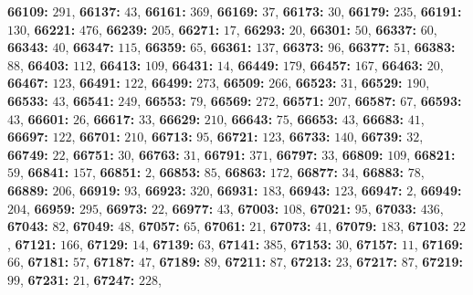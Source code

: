 \textsf{\bfseries 66109:} $291$, \textsf{\bfseries 66137:} $43$, \textsf{\bfseries 66161:} $369$, \textsf{\bfseries 66169:} $37$, \textsf{\bfseries 66173:} $30$, \textsf{\bfseries 66179:} $235$, \textsf{\bfseries 66191:} $130$, \textsf{\bfseries 66221:} $476$, \textsf{\bfseries 66239:} $205$, \textsf{\bfseries 66271:} $17$, \textsf{\bfseries 66293:} $20$, \textsf{\bfseries 66301:} $50$, \textsf{\bfseries 66337:} $60$, \textsf{\bfseries 66343:} $40$, \textsf{\bfseries 66347:} $115$, \textsf{\bfseries 66359:} $65$, \textsf{\bfseries 66361:} $137$, \textsf{\bfseries 66373:} $96$, \textsf{\bfseries 66377:} $51$, \textsf{\bfseries 66383:} $88$, \textsf{\bfseries 66403:} $112$, \textsf{\bfseries 66413:} $109$, \textsf{\bfseries 66431:} $14$, \textsf{\bfseries 66449:} $179$, \textsf{\bfseries 66457:} $167$, \textsf{\bfseries 66463:} $20$, \textsf{\bfseries 66467:} $123$, \textsf{\bfseries 66491:} $122$, \textsf{\bfseries 66499:} $273$, \textsf{\bfseries 66509:} $266$, \textsf{\bfseries 66523:} $31$, \textsf{\bfseries 66529:} $190$, \textsf{\bfseries 66533:} $43$, \textsf{\bfseries 66541:} $249$, \textsf{\bfseries 66553:} $79$, \textsf{\bfseries 66569:} $272$, \textsf{\bfseries 66571:} $207$, \textsf{\bfseries 66587:} $67$, \textsf{\bfseries 66593:} $43$, \textsf{\bfseries 66601:} $26$, \textsf{\bfseries 66617:} $33$, \textsf{\bfseries 66629:} $210$, \textsf{\bfseries 66643:} $75$, \textsf{\bfseries 66653:} $43$, \textsf{\bfseries 66683:} $41$, \textsf{\bfseries 66697:} $122$, \textsf{\bfseries 66701:} $210$, \textsf{\bfseries 66713:} $95$, \textsf{\bfseries 66721:} $123$, \textsf{\bfseries 66733:} $140$, \textsf{\bfseries 66739:} $32$, \textsf{\bfseries 66749:} $22$, \textsf{\bfseries 66751:} $30$, \textsf{\bfseries 66763:} $31$, \textsf{\bfseries 66791:} $371$, \textsf{\bfseries 66797:} $33$, \textsf{\bfseries 66809:} $109$, \textsf{\bfseries 66821:} $59$, \textsf{\bfseries 66841:} $157$, \textsf{\bfseries 66851:} $2$, \textsf{\bfseries 66853:} $85$, \textsf{\bfseries 66863:} $172$, \textsf{\bfseries 66877:} $34$, \textsf{\bfseries 66883:} $78$, \textsf{\bfseries 66889:} $206$, \textsf{\bfseries 66919:} $93$, \textsf{\bfseries 66923:} $320$, \textsf{\bfseries 66931:} $183$, \textsf{\bfseries 66943:} $123$, \textsf{\bfseries 66947:} $2$, \textsf{\bfseries 66949:} $204$, \textsf{\bfseries 66959:} $295$, \textsf{\bfseries 66973:} $22$, \textsf{\bfseries 66977:} $43$, \textsf{\bfseries 67003:} $108$, \textsf{\bfseries 67021:} $95$, \textsf{\bfseries 67033:} $436$, \textsf{\bfseries 67043:} $82$, \textsf{\bfseries 67049:} $48$, \textsf{\bfseries 67057:} $65$, \textsf{\bfseries 67061:} $21$, \textsf{\bfseries 67073:} $41$, \textsf{\bfseries 67079:} $183$, \textsf{\bfseries 67103:} $22$, \textsf{\bfseries 67121:} $166$, \textsf{\bfseries 67129:} $14$, \textsf{\bfseries 67139:} $63$, \textsf{\bfseries 67141:} $385$, \textsf{\bfseries 67153:} $30$, \textsf{\bfseries 67157:} $11$, \textsf{\bfseries 67169:} $66$, \textsf{\bfseries 67181:} $57$, \textsf{\bfseries 67187:} $47$, \textsf{\bfseries 67189:} $89$, \textsf{\bfseries 67211:} $87$, \textsf{\bfseries 67213:} $23$, \textsf{\bfseries 67217:} $87$, \textsf{\bfseries 67219:} $99$, \textsf{\bfseries 67231:} $21$, \textsf{\bfseries 67247:} $228$, 
